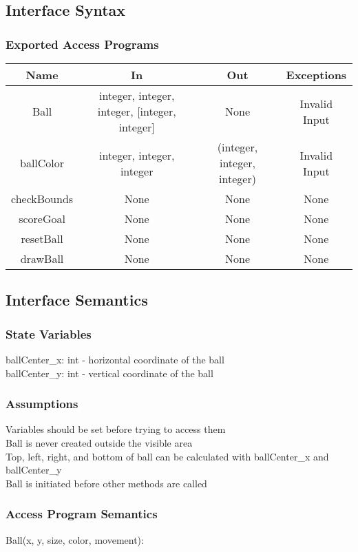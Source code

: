 \documentclass[12pt, titlepage]{article}
\begin{document}
		\subsection{Interface Syntax}
		\subsubsection{Exported Access Programs}
		\begin{tabular}[pos]{|c|c|c|c|}
			\hline
			\textbf{Name}& \textbf{In} & \textbf{Out} & \textbf{Exceptions} \\ \hline
			Ball & integer, integer, integer, [integer, integer] & None & Invalid Input \\ \hline
			ballColor & integer, integer, integer & (integer, integer, integer) & Invalid Input \\ \hline
			checkBounds & None & None & None \\ \hline
			scoreGoal & None & None & None \\ \hline
			resetBall & None & None & None \\ \hline
			drawBall & None & None & None \\ \hline
		\end{tabular}
		
		\subsection{Interface Semantics}
		\subsubsection{State Variables}
		ballCenter\_x: int - horizontal coordinate of the ball \\
		ballCenter\_y: int - vertical coordinate of the ball
		
		\subsubsection{Assumptions}
		Variables should be set before trying to access them \\ 
		Ball is never created outside the visible area \\
		Top, left, right, and bottom of ball can be calculated with ballCenter\_x and ballCenter\_y \\
		Ball is initiated before other methods are called
		
		\subsubsection{Access Program Semantics}
		Ball(x, y, size, color, movement):
		
\end{document}
